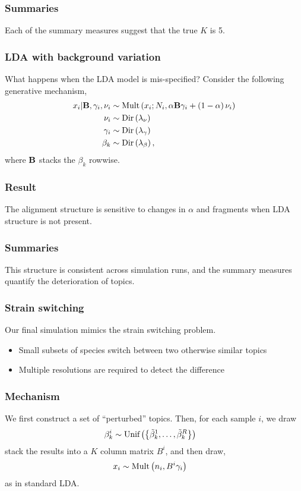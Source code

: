 \documentclass{beamer}
\begin{document}
\begin{frame}
  \frametitle{Summaries}
  Each of the summary measures suggest that the true $K$ is 5.
\end{frame}

\begin{frame}
  \frametitle{LDA with background variation}
  What happens when the LDA model is mis-specified? Consider the following
  generative mechanism,
  \begin{align*}
x_{i} \vert \mathbf{B}, \gamma_{i}, \nu_i &\sim \text{Mult}\left(x_{i} ; N_{i}, \alpha \mathbf{B}\gamma_{i} + \left(1 - \alpha\right)\nu_i\right) \\
\nu_{i} &\sim \text{Dir}\left(\lambda_{\nu}\right) \\
\gamma_i &\sim \text{Dir}\left(\lambda_{\gamma}\right) \\
\beta_{k} &\sim \text{Dir}\left(\lambda_{\beta}\right),
\end{align*}
where $\mathbf{B}$ stacks the $\beta_k$ rowwise.
\end{frame}

\begin{frame}
  \frametitle{Result}
  The alignment structure is sensitive to changes in $\alpha$ and fragments when
  LDA structure is not present.
\end{frame}

\begin{frame}
  \frametitle{Summaries}
  This structure is consistent across simulation runs, and the summary measures
  quantify the deterioration of topics.
\end{frame}

\begin{frame}
  \frametitle{Strain switching}
  Our final simulation mimics the strain switching problem.
  \begin{itemize}
    \item Small subsets of species switch between two otherwise similar topics
    \item Multiple resolutions are required to detect the difference
  \end{itemize}
\end{frame}

\begin{frame}
\frametitle{Mechanism}
We first construct a set of ``perturbed'' topics. Then, for each sample $i$, we draw
\begin{align*}
\beta_{k}^{i} &\sim \textnormal{Unif}\left(\left\{\tilde{\beta}_{k}^{1}, \dots, \tilde{\beta}_{k}^{R}\right\}\right)
\end{align*}
stack the results into a $K$ column matrix $B^{i}$, and then draw,
\begin{align}
x_{i} &\sim \text{Mult}\left(n_{i}, B^{i}\gamma_{i}\right)
\end{align}
as in standard LDA.
\end{frame}
\end{document}
